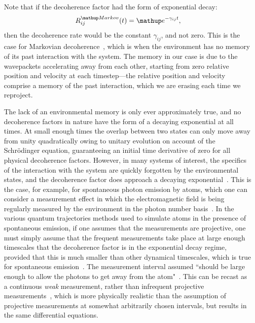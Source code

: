 Note that if the decoherence factor had the form of exponential decay:
\begin{align}
R^\up{Markov}_{ij}(t) = \ee^{-\gamma_{ij} t}, 
\end{align}
then the decoherence rate would be the constant $\gamma_{ij}$, and not zero. This is the case for Markovian decoherence~\cite{schlosshauer_decoherence:_2007}, which is when the environment has no memory of its past interaction with the system. The memory in our case is due to the wavepackets accelerating away from each other, starting from zero relative position and velocity at each timestep---the relative position and velocity comprise a memory of the past interaction, which we are erasing each time we reproject.

The lack of an environmental memory is only ever approximately true, and no decoherence factors in nature have the form of a decaying exponential at all times. At small enough times the overlap between two states can only move away from unity quadratically owing to unitary evolution on account of the Schr\"odinger equation, guaranteeing an initial time derivative of zero for all physical decoherence factors. However, in many systems of interest, the specifics of the interaction with the system are quickly forgotten by the environmental states, and the decoherence factor does approach a decaying exponential~\cite{0034-4885-41-4-003}. This is the case, for example, for spontaneous photon emission by atoms, which one can consider a measurement effect in which the electromagnetic field is being regularly measured by the environment in the photon number basis~\cite{1355-5111-8-1-015, Molmer:93, RevModPhys.70.101}. In the various quantum trajectories methods used to simulate atoms in the presence of spontaneous emission, if one assumes that the measurements are projective, one must simply assume that the frequent measurements take place at large enough timescales that the decoherence factor is in the exponential decay regime, provided that this is much smaller than other dynamical timescales, which is true for spontaneous emission~\cite{RevModPhys.70.101}. The measurement interval assumed ``should be large enough to allow the photons to get away from the atom"~\cite{2003LNP...622..233H}. This can be recast as a continuous \emph{weak} measurement, rather than infrequent projective measurements~\cite{doi:10.1080/00107510601101934, RevModPhys.70.101}, which is more physically realistic than the assumption of projective measurements at somewhat arbitrarily chosen intervals, but results in the same differential equations.

